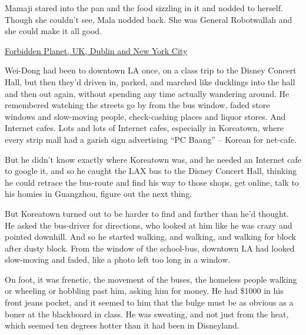 Mamaji stared into the pan and the food sizzling in it and nodded
to herself. Though she couldn't see, Mala nodded back. She was
General Robotwallah and she could make it all good.

\tb

{\href{http://www.forbiddenplanet.co.uk}{Forbidden Planet, UK, Dublin and New York City}}

Wei-Dong had been to downtown LA once, on a class trip to the
Disney Concert Hall, but then they'd driven in, parked, and marched
like ducklings into the hall and then out again, without spending
any time actually wandering around. He remembered watching the
streets go by from the bus window, faded store windows and
slow-moving people, check-cashing places and liquor stores. And
Internet cafes. Lots and lots of Internet cafes, especially in
Koreatown, where every strip mall had a garish sign advertising ``PC
Baang'' -- Korean for net-cafe.

But he didn't know exactly where Koreatown was, and he needed an
Internet cafe to google it, and so he caught the LAX bus to the
Disney Concert Hall, thinking he could retrace the bus-route and
find his way to those shops, get online, talk to his homies in
Guangzhou, figure out the next thing.

But Koreatown turned out to be harder to find and farther than he'd
thought. He asked the bus-driver for directions, who looked at him
like he was crazy and pointed downhill. And so he started walking,
and walking, and walking for block after dusty block. From the
window of the school-bus, downtown LA had looked slow-moving and
faded, like a photo left too long in a window.

On foot, it was frenetic, the movement of the buses, the homeless
people walking or wheeling or hobbling past him, asking him for
money. He had \$1000 in his front jeans pocket, and it seemed to
him that the bulge must be as obvious as a boner at the blackboard
in class. He was sweating, and not just from the heat, which seemed
ten degrees hotter than it had been in Disneyland.

